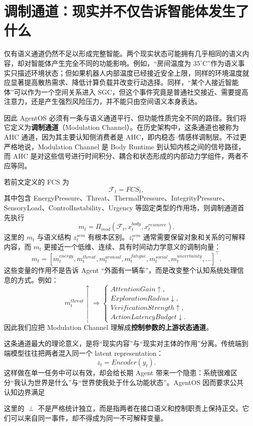 \section{调制通道：现实并不仅告诉智能体发生了什么}
\label{sec:modulation-channel}

仅有语义通道仍然不足以形成完整智能。两个现实状态可能拥有几乎相同的语义内容，却对智能体产生完全不同的功能影响。例如，“房间温度为 $35^\circ$C”作为语义事实只描述环境状态；但如果机器人内部温度已经接近安全上限，同样的环境温度就应显著提高散热需求、降低计算负载并改变行动选择。同样，“某个人接近智能体”可以作为一个空间关系进入 SGC，但这个事件究竟是普通社交接近、需要提高注意力，还是产生强烈风险压力，并不能只由空间语义本身表达。

因此 AgentOS 必须有一条与语义通道平行、但功能性质完全不同的路径。我们将它定义为\textbf{调制通道}（Modulation Channel）。在历史架构中，这条通道也被称为 AHC 通道，因为其主要认知侧消费者是 AHC，即内稳态--情感样调制层。不过更严格地说，Modulation Channel 是 Body Runtime 到认知内核之间的信号路径，而 AHC 是对这些信号进行时间积分、耦合和状态形成的内部动力学组件，两者不应等同。

若前文定义的 FCS 为
\[
\mathcal{F}_t
=
FCS_t,
\]
其中包含 EnergyPressure、Threat、ThermalPressure、IntegrityPressure、SensoryLoad、ControlInstability、Urgency 等固定类型的作用场，则调制通道首先执行
\[
m_t
=
\Pi_{mod}
\left(
\mathcal{F}_t,
x_t^{body},
x_t^{resource}
\right).
\]
这里的 $m_t$ 与语义结构 $z_t^{sem}$ 有根本区别。$z_t^{sem}$ 通常需要保留对象和关系的可解释内容，而 $m_t$ 更接近一个低维、连续、具有时间动力学意义的调制向量：
\[
m_t
=
[
m_t^{energy},
m_t^{threat},
m_t^{arousal},
m_t^{fatigue},
m_t^{social},
m_t^{uncertainty},
\ldots
]^\top.
\]
这些变量的作用不是告诉 Agent “外面有一辆车”，而是改变整个认知系统处理信息的方式。例如：
\[
m_t^{threat}\uparrow
\Rightarrow
\begin{cases}
AttentionGain\uparrow,\\
ExplorationRadius\downarrow,\\
VerificationStrength\uparrow,\\
ActionLatencyBudget\downarrow.
\end{cases}
\]
因此我们应把 Modulation Channel 理解成\textbf{控制参数的上游状态通道}。

这条通道最大的理论意义，是将“现实内容”与“现实对主体的作用”分离。传统端到端模型往往把两者混入同一个 latent representation：
\[
z_t
=
Encoder(y_t).
\]
这样做在单一任务中可以有效，却会给长期 Agent 带来一个隐患：系统很难区分“我认为世界是什么”与“世界使我处于什么功能状态”。AgentOS 因而要求公共认知边界满足
\begin{statementbox}
\centering
{}
\end{statementbox}
这里的 $\perp$ 不是严格统计独立，而是指两者在接口语义和控制职责上保持正交。它们可以来自同一事件，却不得成为同一不可解释变量。

